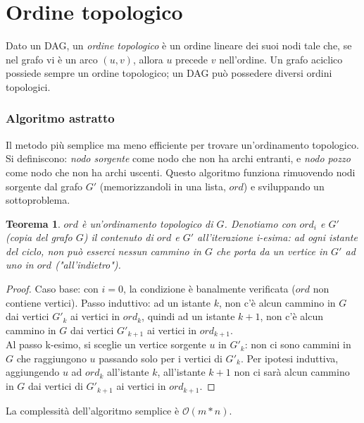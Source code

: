 \documentclass[11pt]{book}
\newtheorem*{theorem}{Teorema}
\begin{document}
\section{Ordine topologico}
Dato un DAG, un \textit{ordine topologico} è un ordine lineare dei suoi nodi tale che, se nel grafo vi è un arco $(u,v)$, 
allora $u$ precede $v$ nell'ordine. Un grafo aciclico possiede sempre un ordine topologico; un DAG può possedere diversi 
ordini topologici.
\subsubsection{Algoritmo astratto}
Il metodo più semplice ma meno efficiente per trovare un'ordinamento topologico. Si definiscono: \textit{nodo sorgente} 
come nodo che non ha archi entranti, e \textit{nodo pozzo} come nodo che non ha archi uscenti. Questo algoritmo funziona
rimuovendo nodi sorgente dal grafo $G'$ (memorizzandoli in una lista, $ord$) e sviluppando un sottoproblema.
\begin{theorem}
    $ord$ è un'ordinamento topologico di $G$. Denotiamo con $ord_i$ e $G'$ (copia del grafo $G$) il contenuto di $ord$ e
    $G'$ all'iterazione i-esima: ad ogni istante del ciclo, non può esserci nessun cammino in $G$ che porta da un vertice 
    in $G'$ ad uno in $ord$ ("all'indietro").
\end{theorem}
\begin{proof}
    Caso base: con $i=0$, la condizione è banalmente verificata ($ord$ non contiene vertici).
    Passo induttivo: ad un istante $k$, non c'è alcun cammino in $G$ dai vertici $G'_k$ ai vertici in $ord_k$, quindi 
    ad un istante $k+1$, non c'è alcun cammino in $G$ dai vertici $G'_{k+1}$ ai vertici in $ord_{k+1}$.\\
    Al passo k-esimo, si sceglie un vertice sorgente $u$ in $G'_k$: non ci sono cammini in $G$ che raggiungono $u$ passando solo 
    per i vertici di $G'_k$. Per ipotesi induttiva, aggiungendo $u$ ad $ord_k$ all'istante $k$, all'istante $k+1$ non ci 
    sarà alcun cammino in $G$ dai vertici di $G'_{k+1}$ ai vertici in $ord_{k+1}$.
\end{proof}
La complessità dell'algoritmo semplice è $\mathcal{O}(m*n)$.
\end{document}

